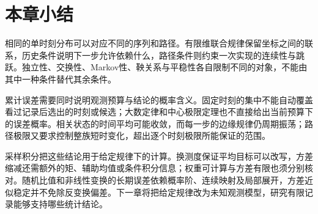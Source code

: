 \section{本章小结}
\label{sec:stochastic-processes-and-approximation-summary}
\label{sec:random-sequences-and-processes-summary}

相同的单时刻分布可以对应不同的序列和路径。有限维联合规律保留坐标之间的联系，历史条件说明下一步允许依赖什么，路径条件则约束一次实现的连续性与跳跃。独立性、交换性、Markov性、鞅关系与平稳性各自限制不同的对象，不能由其中一种条件替代其余条件。

累计误差需要同时说明观测预算与结论的概率含义。固定时刻的集中不能自动覆盖看过记录后选出的时刻或候选；大数定律和中心极限定理也不直接给出当前预算下的误差概率。相关状态的时间平均可能收敛，而每一步的边缘规律仍周期振荡；路径极限又要求控制整族短时变化，超出逐个时刻极限所能保证的范围。

采样积分把这些结论用于给定规律下的计算。换测度保证平均目标可以改写，方差缩减还需额外的矩、辅助均值或条件积分信息；权重可计算与方差有限也须分别核对。随机比值和非线性变换的长期误差依赖概率阶、连续映射及局部展开，方差近似稳定并不免除反变换偏差。下一章将把给定规律改为未知观测模型，研究有限记录能够支持哪些统计结论。

